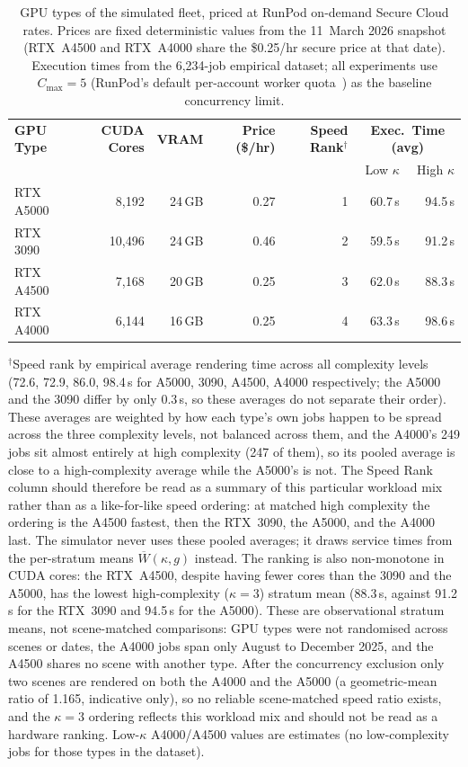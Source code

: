 \begin{table}[htbp]
\centering
\caption[GPU fleet configuration]{GPU types of the simulated fleet, priced at RunPod on-demand Secure Cloud rates. Prices are fixed deterministic values from the 11~March 2026 snapshot (RTX~A4500 and RTX~A4000 share the \$0.25/hr secure price at that date). Execution times from the 6,234-job empirical dataset; all experiments use $C_{\max}=5$ (RunPod's default per-account worker quota~\cite{runpod2026maxworkers}) as the baseline concurrency limit.}
\label{tab:gpu_specs}
\small
\begin{tabular}{lrrrrrr}
\toprule
\textbf{GPU Type} & \textbf{CUDA Cores} & \textbf{VRAM} & \textbf{Price (\$/hr)} & \textbf{Speed Rank}$^\dagger$ & \multicolumn{2}{c}{\textbf{Exec.\ Time (avg)}} \\
& & & & & Low $\kappa$ & High $\kappa$ \\
\midrule
RTX A5000 &  8,192 & 24\,GB & 0.27 & 1 & 60.7\,s & 94.5\,s \\
RTX 3090  & 10,496 & 24\,GB & 0.46 & 2 & 59.5\,s & 91.2\,s \\
RTX A4500 &  7,168 & 20\,GB & 0.25 & 3 & 62.0\,s & 88.3\,s \\
RTX A4000 &  6,144 & 16\,GB & 0.25 & 4 & 63.3\,s & 98.6\,s \\
\bottomrule
\end{tabular}
\vspace{6pt}
\raggedright\small $^\dagger$Speed rank by empirical average rendering time across all complexity levels (72.6, 72.9, 86.0, 98.4\,s for A5000, 3090, A4500, A4000 respectively; the A5000 and the 3090 differ by only 0.3\,s, so these averages do not separate their order). These averages are weighted by how each type's own jobs happen to be spread across the three complexity levels, not balanced across them, and the A4000's 249 jobs sit almost entirely at high complexity (247 of them), so its pooled average is close to a high-complexity average while the A5000's is not. The Speed Rank column should therefore be read as a summary of this particular workload mix rather than as a like-for-like speed ordering: at matched high complexity the ordering is the A4500 fastest, then the RTX~3090, the A5000, and the A4000 last. The simulator never uses these pooled averages; it draws service times from the per-stratum means $\overline{W}(\kappa, g)$ instead. The ranking is also non-monotone in CUDA cores: the RTX~A4500, despite having fewer cores than the 3090 and the A5000, has the lowest high-complexity ($\kappa=3$) stratum mean (88.3\,s, against 91.2\,s for the RTX~3090 and 94.5\,s for the A5000). These are observational stratum means, not scene-matched comparisons: GPU types were not randomised across scenes or dates, the A4000 jobs span only August to December 2025, and the A4500 shares no scene with another type. After the concurrency exclusion only two scenes are rendered on both the A4000 and the A5000 (a geometric-mean ratio of 1.165, indicative only), so no reliable scene-matched speed ratio exists, and the $\kappa=3$ ordering reflects this workload mix and should not be read as a hardware ranking. Low-$\kappa$ A4000/A4500 values are estimates (no low-complexity jobs for those types in the dataset).
\normalsize
\end{table}

